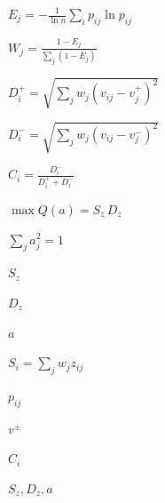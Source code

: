 
$E_j=-\frac{1}{\ln n}\sum_i p_{ij}\ln p_{ij}$

$W_j=\frac{1-E_j}{\sum_j(1-E_j)}$

$D_i^+=\sqrt{\sum_j w_j(v_{ij}-v_j^+)^2}$

$D_i^-=\sqrt{\sum_j w_j(v_{ij}-v_j^-)^2}$

$C_i=\frac{D_i^-}{D_i^++D_i^-}$

$\max Q(a)=S_z\,D_z$

$\sum_j a_j^2=1$

$S_z$

$D_z$

$a$

$S_i=\sum_j w_j z_{ij}$

$p_{ij}$

$v^\pm$

$C_i$

$S_z,D_z,a$
